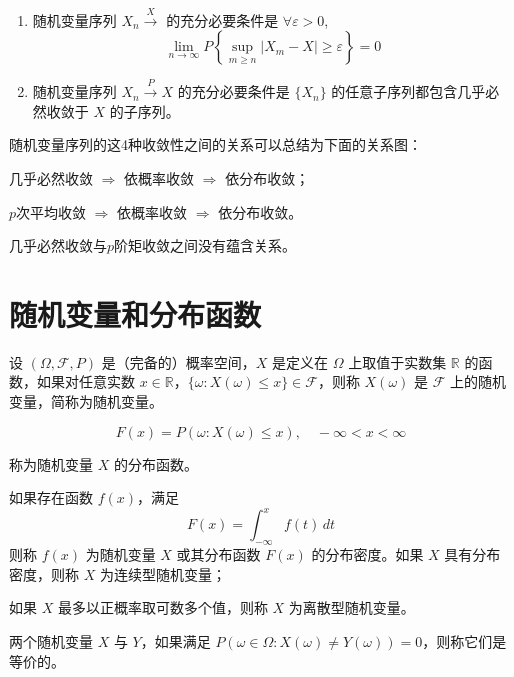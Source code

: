 \documentclass[lang=cn,10pt,thmcnt=section]{elegantbook}
\begin{document}
\begin{theorem}
	\begin{enumerate}
		\item 随机变量序列 \(X_n \xrightarrow X\) 的充分必要条件是 \(\forall \varepsilon > 0\),
		\[
		\lim_{n \to \infty} P\left\{\sup_{m \geq n} |X_m - X| \geq \varepsilon\right\} = 0
		\]
		\item 随机变量序列 \(X_n \overset{P}{\rightarrow} X\) 的充分必要条件是 \(\{X_n\}\) 的任意子序列都包含几乎必然收敛于 \(X\) 的子序列。
	\end{enumerate}
\end{theorem}

随机变量序列的这4种收敛性之间的关系可以总结为下面的关系图：

几乎必然收敛 \(\Longrightarrow\) 依概率收敛 \(\Longrightarrow\) 依分布收敛；

\(p\)次平均收敛 \(\Longrightarrow\) 依概率收敛 \(\Longrightarrow\) 依分布收敛。

\begin{remark}
	几乎必然收敛与\(p\)阶矩收敛之间没有蕴含关系。
\end{remark}



\section{随机变量和分布函数}

\begin{definition}
	设 $(\Omega, \mathcal{F}, P)$ 是（完备的）概率空间，$X$ 是定义在 $\Omega$ 上取值于实数集 $\mathbb{R}$ 的函数，如果对任意实数 $x \in \mathbb{R}$，$\{\omega : X(\omega) \leq x\} \in \mathcal{F}$，则称 $X(\omega)$ 是 $\mathcal{F}$ 上的随机变量，简称为随机变量。

\[
F(x) = P(\omega : X(\omega) \leq x), \quad -\infty < x < \infty
\]

称为随机变量 $X$ 的分布函数。

如果存在函数 $f(x)$，满足
\[
F(x) = \int_{-\infty}^{x} f(t) \, dt
\]
则称 $f(x)$ 为随机变量 $X$ 或其分布函数 $F(x)$ 的分布密度。如果 $X$ 具有分布密度，则称 $X$ 为连续型随机变量；

如果 $X$ 最多以正概率取可数多个值，则称 $X$ 为离散型随机变量。

\end{definition}
\begin{definition}
	两个随机变量 $X$ 与 $Y$，如果满足 $P(\omega \in \Omega : X(\omega) \neq Y(\omega)) = 0$，则称它们是等价的。
\end{definition}
\end{document}
